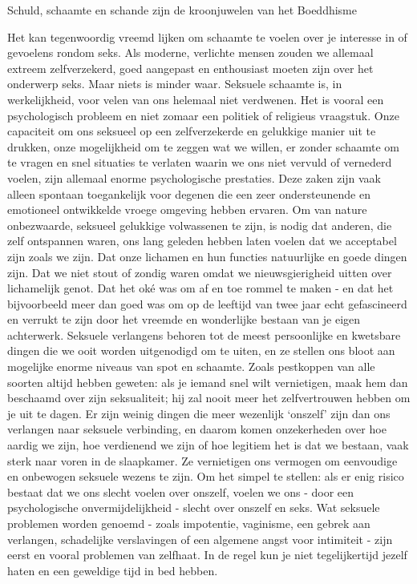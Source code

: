 Schuld, schaamte en schande zijn de kroonjuwelen van het Boeddhisme

Het kan tegenwoordig vreemd lijken om schaamte te voelen over je interesse in of gevoelens rondom seks. Als moderne, verlichte mensen zouden we allemaal extreem zelfverzekerd, goed aangepast en enthousiast moeten zijn over het onderwerp seks.
Maar niets is minder waar. Seksuele schaamte is, in werkelijkheid, voor velen van ons helemaal niet verdwenen. Het is vooral een psychologisch probleem en niet zomaar een politiek of religieus vraagstuk.
Onze capaciteit om ons seksueel op een zelfverzekerde en gelukkige manier uit te drukken, onze mogelijkheid om te zeggen wat we willen, er zonder schaamte om te vragen en snel situaties te verlaten waarin we ons niet vervuld of vernederd voelen, zijn allemaal enorme psychologische prestaties. Deze zaken zijn vaak alleen spontaan toegankelijk voor degenen die een zeer ondersteunende en emotioneel ontwikkelde vroege omgeving hebben ervaren. Om van nature onbezwaarde, seksueel gelukkige volwassenen te zijn, is nodig dat anderen, die zelf ontspannen waren, ons lang geleden hebben laten voelen dat we acceptabel zijn zoals we zijn. Dat onze lichamen en hun functies natuurlijke en goede dingen zijn. Dat we niet stout of zondig waren omdat we nieuwsgierigheid uitten over lichamelijk genot. Dat het oké was om af en toe rommel te maken - en dat het bijvoorbeeld meer dan goed was om op de leeftijd van twee jaar echt gefascineerd en verrukt te zijn door het vreemde en wonderlijke bestaan van je eigen achterwerk.
Seksuele verlangens behoren tot de meest persoonlijke en kwetsbare dingen die we ooit worden uitgenodigd om te uiten, en ze stellen ons bloot aan mogelijke enorme niveaus van spot en schaamte. Zoals pestkoppen van alle soorten altijd hebben geweten: als je iemand snel wilt vernietigen, maak hem dan beschaamd over zijn seksualiteit; hij zal nooit meer het zelfvertrouwen hebben om je uit te dagen.
Er zijn weinig dingen die meer wezenlijk ‘onszelf’ zijn dan ons verlangen naar seksuele verbinding, en daarom komen onzekerheden over hoe aardig we zijn, hoe verdienend we zijn of hoe legitiem het is dat we bestaan, vaak sterk naar voren in de slaapkamer. Ze vernietigen ons vermogen om eenvoudige en onbewogen seksuele wezens te zijn. Om het simpel te stellen: als er enig risico bestaat dat we ons slecht voelen over onszelf, voelen we ons - door een psychologische onvermijdelijkheid - slecht over onszelf en seks. Wat seksuele problemen worden genoemd - zoals impotentie, vaginisme, een gebrek aan verlangen, schadelijke verslavingen of een algemene angst voor intimiteit - zijn eerst en vooral problemen van zelfhaat. In de regel kun je niet tegelijkertijd jezelf haten en een geweldige tijd in bed hebben.
